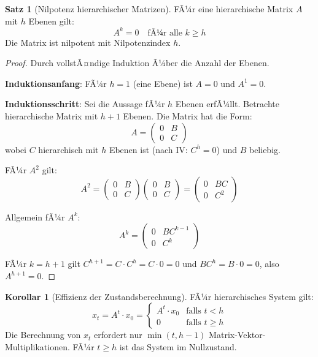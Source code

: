 ﻿\documentclass[a4paper,12pt]{report}
\theoremstyle{definition}
\newtheorem{satz}{Satz}
\newtheorem{korollar}{Korollar}
\begin{document}
	\begin{satz}[Nilpotenz hierarchischer Matrizen]
		FÃ¼r eine hierarchische Matrix $A$ mit $h$ Ebenen gilt:
		\[
		A^k = 0 \quad \text{fÃ¼r alle } k \geq h
		\]
		Die Matrix ist nilpotent mit Nilpotenzindex $h$.
	\end{satz}
	
	\begin{proof}
		Durch vollstÃ¤ndige Induktion Ã¼ber die Anzahl der Ebenen.
		
		\textbf{Induktionsanfang}: FÃ¼r $h = 1$ (eine Ebene) ist $A = 0$ und $A^1 = 0$.
		
		\textbf{Induktionsschritt}: Sei die Aussage fÃ¼r $h$ Ebenen erfÃ¼llt. Betrachte hierarchische Matrix mit $h+1$ Ebenen. Die Matrix hat die Form:
		\[
		A = \begin{pmatrix}
			0 & B \\
			0 & C
		\end{pmatrix}
		\]
		wobei $C$ hierarchisch mit $h$ Ebenen ist (nach IV: $C^h = 0$) und $B$ beliebig.
		
		FÃ¼r $A^2$ gilt:
		\[
		A^2 = \begin{pmatrix}
			0 & B \\
			0 & C
		\end{pmatrix} \begin{pmatrix}
			0 & B \\
			0 & C
		\end{pmatrix} = \begin{pmatrix}
			0 & BC \\
			0 & C^2
		\end{pmatrix}
		\]
		
		Allgemein fÃ¼r $A^k$:
		\[
		A^k = \begin{pmatrix}
			0 & BC^{k-1} \\
			0 & C^k
		\end{pmatrix}
		\]
		
		FÃ¼r $k = h+1$ gilt $C^{h+1} = C \cdot C^h = C \cdot 0 = 0$ und $BC^h = B \cdot 0 = 0$, also $A^{h+1} = 0$.
	\end{proof}
	
	\begin{korollar}[Effizienz der Zustandsberechnung]
		FÃ¼r hierarchisches System gilt:
		\[
		x_t = A^t \cdot x_0 = \begin{cases}
			A^t \cdot x_0 & \text{falls } t < h \\
			0 & \text{falls } t \geq h
		\end{cases}
		\]
		Die Berechnung von $x_t$ erfordert nur $\min(t, h-1)$ Matrix-Vektor-Multiplikationen. FÃ¼r $t \geq h$ ist das System im Nullzustand.
	\end{korollar}
	
\end{document}
